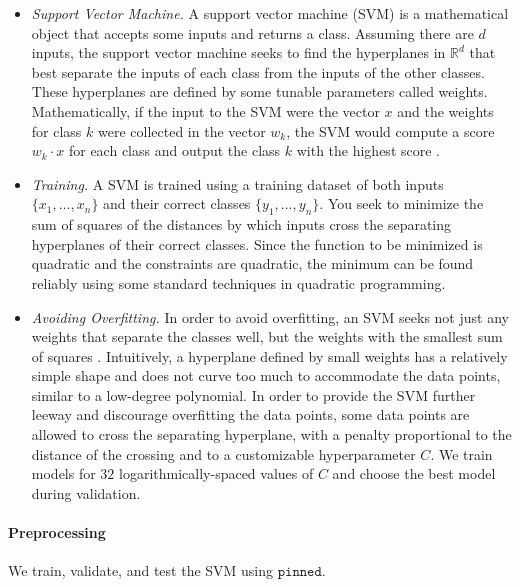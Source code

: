 \documentclass[10pt,letterpaper]{article}
\begin{document}
            \begin{itemize}
                \item \textit{Support Vector Machine.}
                    A support vector machine (SVM) is a mathematical object that accepts some inputs and returns a class. Assuming there are $d$ inputs, the support vector machine seeks to find the hyperplanes in $\mathbb{R}^d$ that best separate the inputs of each class from the inputs of the other classes. These hyperplanes are defined by some tunable parameters called weights. Mathematically, if the input to the SVM were the vector $x$ and the weights for class $k$ were collected in the vector $w_k$, the SVM would compute a score $w_k \cdot x$ for each class and output the class $k$ with the highest score \cite{Hsu}.
                \item \textit{Training.}
                    A SVM is trained using a training dataset of both inputs $\{x_1, \ldots, x_n\}$ and their correct classes $\{y_1, \ldots, y_n\}$. You seek to minimize the sum of squares of the distances by which inputs cross the separating hyperplanes of their correct classes. Since the function to be minimized is quadratic and the constraints are quadratic, the minimum can be found reliably using some standard techniques in quadratic programming.
                \item \textit{Avoiding Overfitting.}
                    In order to avoid overfitting, an SVM seeks not just any weights that separate the classes well, but the weights with the smallest sum of squares \cite{Hsu}. Intuitively, a hyperplane defined by small weights has a relatively simple shape and does not curve too much to accommodate the data points, similar to a low-degree polynomial. In order to provide the SVM further leeway and discourage overfitting the data points, some data points are allowed to cross the separating hyperplane, with a penalty proportional to the distance of the crossing and to a customizable hyperparameter $C$. We train models for $32$ logarithmically-spaced values of $C$ and choose the best model during validation.
            \end{itemize}
            
        \paragraph*{Preprocessing}
            We train, validate, and test the SVM using $\texttt{pinned}$.
        
\end{document}
